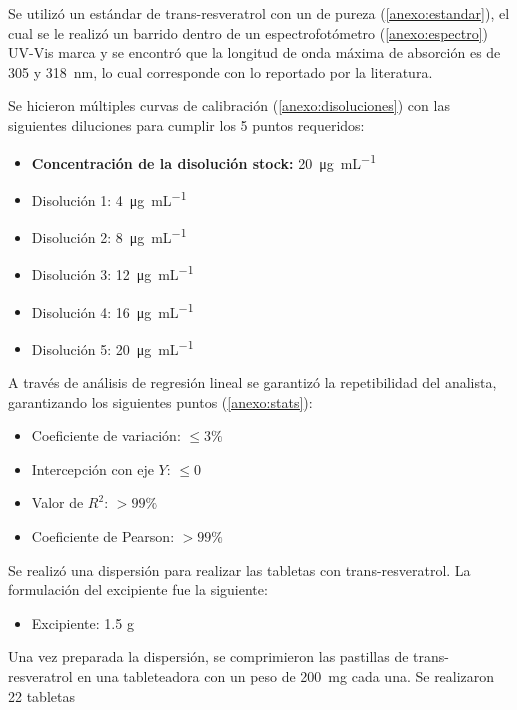 Se utilizó un estándar de trans-resveratrol con un %
de pureza (\ref{anexo:estandar}), el cual se le realizó un barrido dentro de un espectrofotómetro (\ref{anexo:espectro}) UV-Vis marca %
y se encontró que la longitud de onda máxima de absorción es de \num{305} y %
\SI{318}{\nano\meter}, lo cual corresponde con lo reportado por la literatura.

Se hicieron múltiples curvas de calibración (\ref{anexo:disoluciones}) con las siguientes diluciones para cumplir 
los 5 puntos requeridos:

\begin{itemize}
    \item \textbf{Concentración de la disolución stock:} \SI{20}{\micro\gram\per\milli\liter}
\end{itemize}
\begin{multicols}{3}
\begin{itemize}
    \item Disolución 1: \SI{4}{\micro\gram\per\milli\liter}
    \item Disolución 2: \SI{8}{\micro\gram\per\milli\liter}
    \item Disolución 3: \SI{12}{\micro\gram\per\milli\liter}
    \item Disolución 4: \SI{16}{\micro\gram\per\milli\liter}
    \item Disolución 5: \SI{20}{\micro\gram\per\milli\liter}
\end{itemize}
\end{multicols}

A través de análisis de regresión lineal se garantizó la repetibilidad del analista, 
garantizando los siguientes puntos (\ref{anexo:stats}):

\begin{multicols}{2}
    \begin{itemize}
        \item Coeficiente de variación: $\leq 3\%$
        \item Intercepción con eje $Y$: $\leq 0$
        \item Valor de $R^2$: $>99\%$
        \item Coeficiente de Pearson: $>99\%$
    \end{itemize}
\end{multicols}

Se realizó una dispersión para realizar las tabletas con trans-resveratrol. La formulación 
del excipiente fue la siguiente:

\begin{multicols}{2}
\begin{itemize}
    \item Excipiente: 1.5 g
\end{itemize}
\end{multicols}

Una vez preparada la dispersión, se comprimieron las pastillas de trans-resveratrol
en una tableteadora %
con un peso de \SI{200}{\milli\gram} cada una. Se realizaron 22 tabletas